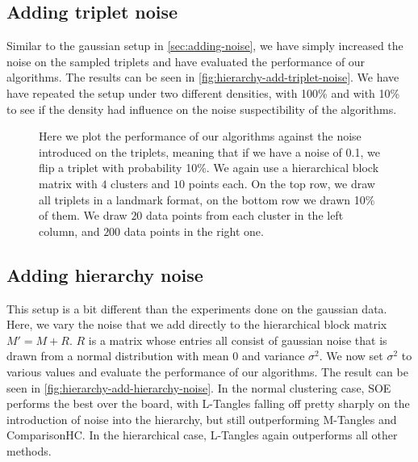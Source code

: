 \subsection{Adding triplet noise}\label{sec:h-triplet-noise}
Similar to the gaussian setup in \autoref{sec:adding-noise}, we have simply increased the noise on the sampled triplets and have evaluated the performance of our algorithms. The results
can be seen in \autoref{fig:hierarchy-add-triplet-noise}. We have have repeated the setup under two different densities, with 100\% and with 10\% to see if the density had influence
on the noise suspectibility of the algorithms.
\onecolumn
\begin{figure}[ht]
    \centering
    \hfill
    \caption{
        Here we plot the performance of our algorithms against the noise introduced on the triplets, meaning that if we
        have a noise of 0.1, we flip a triplet with probability 10\%.  We again use a hierarchical block matrix with $4$ clusters and $10$ points each. 
        On the top row, we draw all triplets in a landmark format, on the bottom row we drawn 10\% of them.    
        We draw $20$ data points from each cluster in the left column, and $200$ data points in the right one.
    }
    \label{fig:hierarchy-add-triplet-noise}
\end{figure}



\subsection{Adding hierarchy noise}\label{sec:adding-hierarchy-noise}
This setup is a bit different than the experiments done on the gaussian data. Here, we vary the noise that we add directly to the hierarchical block matrix $M' = M + R$. 
$R$ is a matrix whose entries all consist of gaussian noise that is drawn from a normal distribution with mean $0$ and variance $\sigma^2$. We now set $\sigma^2$ to various 
values and evaluate the performance of our algorithms. The result can be seen in \autoref{fig:hierarchy-add-hierarchy-noise}. In the normal clustering case, SOE performs the best over the board, with L-Tangles
falling off pretty sharply on the introduction of noise into the hierarchy, but still outperforming M-Tangles and ComparisonHC. In the hierarchical case, L-Tangles again outperforms all other methods.


